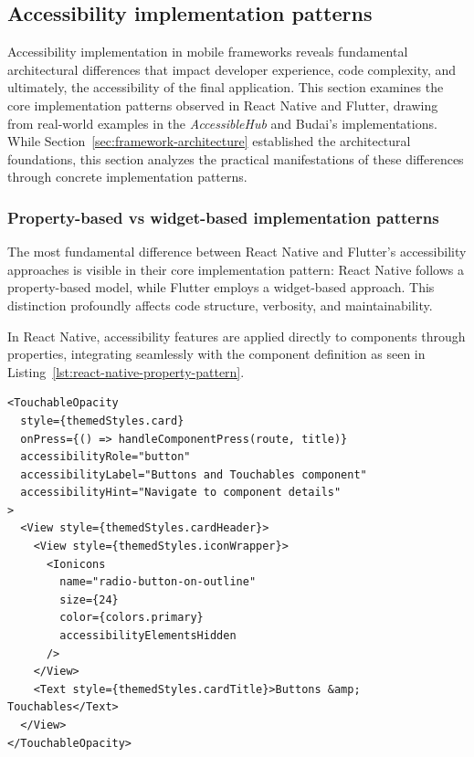 \subsection{Accessibility implementation patterns}
\label{subsec:implementation-patterns}

Accessibility implementation in mobile frameworks reveals fundamental architectural differences that impact developer experience, code complexity, and ultimately, the accessibility of the final application. This section examines the core implementation patterns observed in React Native and Flutter, drawing from real-world examples in the \textit{AccessibleHub} and Budai's implementations. While Section~\ref{sec:framework-architecture} established the architectural foundations, this section analyzes the practical manifestations of these differences through concrete implementation patterns.

\subsubsection{Property-based vs widget-based implementation patterns}
\label{subsubsec:property-widget-patterns}

The most fundamental difference between React Native and Flutter's accessibility approaches is visible in their core implementation pattern: React Native follows a property-based model, while Flutter employs a widget-based approach. This distinction profoundly affects code structure, verbosity, and maintainability.

In React Native, accessibility features are applied directly to components through properties, integrating seamlessly with the component definition as seen in Listing~\ref{lst:react-native-property-pattern}.

\begin{lstlisting}[style=ReactNativeStyle, caption=Property-based accessibility pattern in React Native, label=lst:react-native-property-pattern]
<TouchableOpacity
  style={themedStyles.card}
  onPress={() => handleComponentPress(route, title)}
  accessibilityRole="button"
  accessibilityLabel="Buttons and Touchables component"
  accessibilityHint="Navigate to component details"
>
  <View style={themedStyles.cardHeader}>
    <View style={themedStyles.iconWrapper}>
      <Ionicons
        name="radio-button-on-outline"
        size={24}
        color={colors.primary}
        accessibilityElementsHidden
      />
    </View>
    <Text style={themedStyles.cardTitle}>Buttons &amp; Touchables</Text>
  </View>
</TouchableOpacity>
\end{lstlisting}

